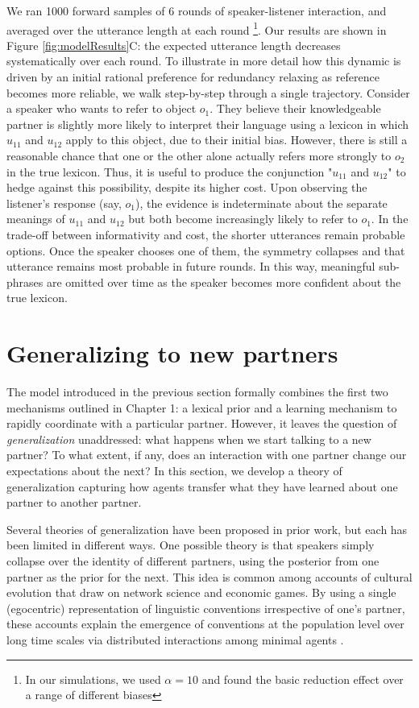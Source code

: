 We ran 1000 forward samples of 6 rounds of speaker-listener interaction, and averaged over the utterance length at each round \footnote{In our simulations, we used $\alpha = 10$ and found the basic reduction effect over a range of different biases}. 
Our results are shown in Figure \ref{fig:modelResults}C: the expected utterance length decreases systematically over each round. 
To illustrate in more detail how this dynamic is driven by an initial rational preference for redundancy relaxing as reference becomes more reliable, we walk step-by-step through a single trajectory. 
Consider a speaker who wants to refer to object $o_1$. 
They believe their knowledgeable partner is slightly more likely to interpret their language using a lexicon in which $u_{11}$ and $u_{12}$ apply to this object, due to their initial bias. 
However, there is still a reasonable chance that one or the other alone actually refers more strongly to $o_2$ in the true lexicon. 
Thus, it is useful to produce the conjunction "$u_{11}$ and $u_{12}$" to hedge against this possibility, despite its higher cost. 
Upon observing the listener's response (say, $o_1$), the evidence is indeterminate about the separate meanings of $u_{11}$ and $u_{12}$ but both become increasingly likely to refer to $o_1$. 
In the trade-off between informativity and cost, the shorter utterances remain probable options. 
Once the speaker chooses one of them, the symmetry collapses and that utterance remains most probable in future rounds. 
In this way, meaningful sub-phrases are omitted over time as the speaker becomes more confident about the true lexicon. 

\section{Generalizing to new partners}

The model introduced in the previous section formally combines the first two mechanisms outlined in Chapter 1: a lexical prior and a learning mechanism to rapidly coordinate with a particular partner.
However, it leaves the question of \emph{generalization} unaddressed: what happens when we start talking to a new partner?
To what extent, if any, does an interaction with one partner change our expectations about the next? 
In this section, we develop a theory of generalization capturing how agents transfer what they have learned about one partner to another partner. 

Several theories of generalization have been proposed in prior work, but each has been limited in different ways.
One possible theory is that speakers simply collapse over the identity of different partners, using the posterior from one partner as the prior for the next. 
This idea is common among accounts of cultural evolution that draw on network science and economic games. 
By using a single (egocentric) representation of linguistic conventions irrespective of one's partner, these accounts explain the emergence of conventions at the population level over long time scales via distributed interactions among minimal agents \cite{steels_self-organizing_1995,barr_establishing_2004,young_evolution_2015,spike_minimal_2017,baronchelli_emergence_2018,hawkins2018emergence}.

